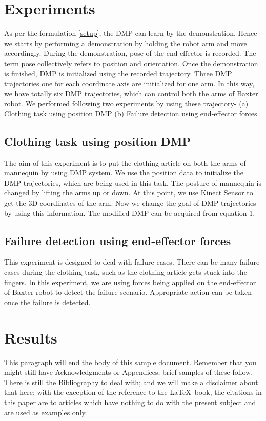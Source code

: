 \documentclass[sigconf]{acmart}
\begin{document}
\section{Experiments}
As per the formulation \ref{setup}, the DMP can learn by the demonstration. Hence we starts by performing a demonstration by holding the robot arm and move accordingly. During the demonstration, pose of the end-effector is recorded. The term pose collectively refers to position and orientation. Once the demonstration is finished, DMP is initialized using the recorded trajectory. Three DMP trajectories one for each coordinate axis are initialized for one arm. In this way, we have totally six DMP trajectories, which can control both the arms of Baxter robot. We performed following two experiments by using these trajectory- (a) Clothing task using position DMP (b) Failure detection using end-effector forces.

\subsection{Clothing task using position DMP}
The aim of this experiment is to put the clothing article on both the arms of mannequin by using DMP system. We use the position data to initialize the DMP trajectories, which are being used in this task. The posture of mannequin is changed by lifting the arms up or down. At this point, we use Kinect Sensor to get the 3D coordinates of the arm. Now we change the goal of DMP trajectories by using this information. The modified DMP can be acquired from equation 1.

\subsection{Failure detection using end-effector forces}
This experiment is designed to deal with failure cases. There can be many failure cases during the clothing task, such as the clothing article gets stuck into the fingers. In this experiment, we are using forces being applied on the end-effector of Baxter robot to detect the failure scenario. Appropriate action can be taken once the failure is detected.

\section{Results}
This paragraph will end the body of this sample document.
Remember that you might still have Acknowledgments or
Appendices; brief samples of these
follow.  There is still the Bibliography to deal with; and
we will make a disclaimer about that here: with the exception
of the reference to the \LaTeX\ book, the citations in
this paper are to articles which have nothing to
do with the present subject and are used as
examples only.
\end{document}
